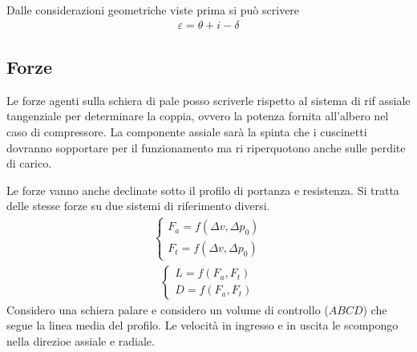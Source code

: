 Dalle considerazioni geometriche viste prima si può scrivere
\begin{align*}
\varepsilon = \theta + i - \delta
\end{align*}

\subsection{Forze}
Le forze agenti sulla schiera di pale posso scriverle rispetto al sistema di rif assiale tangenziale per determinare la coppia, ovvero la potenza fornita all'albero nel caso di compressore. La componente assiale sarà la spinta che i cuscinetti dovranno sopportare per il funzionamento ma ri riperquotono anche sulle perdite di carico. 

Le forze vanno anche declinate sotto il profilo di portanza e resistenza. Si tratta delle stesse forze su due sistemi di riferimento diversi. 
\begin{align*}
	\begin{cases}
		F_a = f(\Delta v, \Delta p_0)\\
		F_t = f(\Delta v, \Delta p_0)
	\end{cases}
\end{align*}
\begin{align*}
	\begin{cases}
		L = f(F_a,F_t)\\
		D = f(F_a,F_t)
	\end{cases}
\end{align*}
Considero una schiera palare e considero un volume di controllo ($ABCD$) che segue la linea media del profilo. Le velocità in ingresso e in uscita le scompongo nella direzioe assiale e radiale. 
